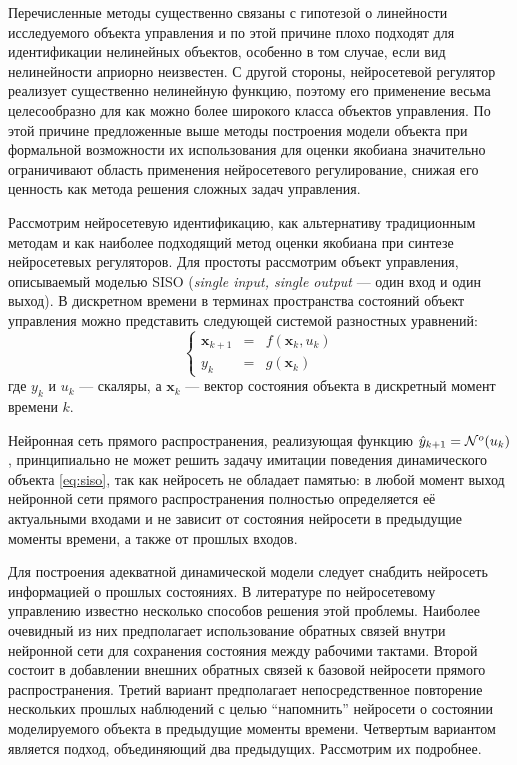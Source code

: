 Перечисленные методы существенно связаны с гипотезой о линейности
исследуемого объекта управления и по этой причине плохо подходят для
идентификации нелинейных объектов, особенно в том случае, если вид
нелинейности априорно неизвестен.  С другой стороны, нейросетевой
регулятор реализует существенно нелинейную функцию, поэтому его
применение весьма целесообразно для как можно более широкого класса
объектов управления.  По этой причине предложенные выше методы
построения модели объекта при формальной возможности их использования
для оценки якобиана значительно ограничивают область применения
нейросетевого регулирование, снижая его ценность как метода решения
сложных задач управления.


Рассмотрим нейросетевую идентификацию, как альтернативу традиционным
методам и как наиболее подходящий метод оценки якобиана при синтезе
нейросетевых регуляторов.  Для простоты рассмотрим объект управления,
описываемый моделью SISO ({\it single input, single output} --- один
вход и один выход).  В дискретном времени в терминах пространства
состояний объект управления можно представить следующей системой
разностных уравнений:
\begin{equation}\label{eq:siso}
\left\{\begin{array}{rcl}
  \mathbf{x}_{k+1} & = & f(\mathbf{x}_k, u_k) \\
  y_k & = & g(\mathbf{x}_k)
\end{array}\right.
\end{equation} где $y_k$ и $u_k$ --- скаляры, а $\mathbf{x}_k$ --- вектор
состояния объекта в дискретный момент времени $k$.

Нейронная сеть прямого распространения, реализующая функцию
$\hat{y}_{k+1} = \mathcal{N}^o(u_k)$, принципиально не может решить задачу
имитации поведения динамического объекта \eqref{eq:siso}, так как
нейросеть не обладает памятью: в любой момент выход нейронной сети
прямого распространения полностью определяется её актуальными
входами и не зависит от состояния нейросети в предыдущие моменты
времени, а также от прошлых входов.

Для построения адекватной динамической модели следует снабдить
нейросеть информацией о прошлых состояниях.  В литературе по
нейросетевому управлению известно несколько способов решения этой
проблемы.  Наиболее очевидный из них предполагает использование
обратных связей внутри нейронной сети для сохранения состояния между
рабочими тактами.  Второй состоит в добавлении внешних обратных связей
к базовой нейросети прямого распространения.  Третий вариант
предполагает непосредственное повторение нескольких прошлых наблюдений
с целью ``напомнить'' нейросети о состоянии моделируемого объекта в
предыдущие моменты времени.  Четвертым вариантом является подход,
объединяющий два предыдущих.  Рассмотрим их подробнее.

